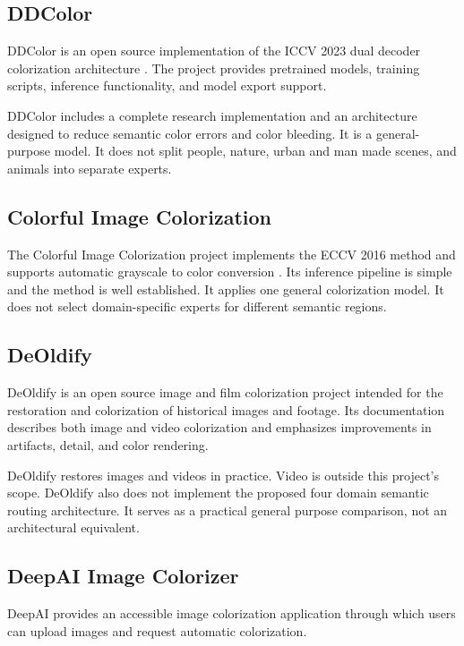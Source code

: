 \documentclass{FastFyp}
\begin{document}
\subsection{DDColor}

DDColor is an open source implementation of the ICCV 2023 dual decoder colorization architecture \cite{ref9,ref10}. The project provides pretrained models, training scripts, inference functionality, and model export support.

DDColor includes a complete research implementation and an architecture designed to reduce semantic color errors and color bleeding. It is a general-purpose model. It does not split people, nature, urban and man made scenes, and animals into separate experts.

\subsection{Colorful Image Colorization}

The Colorful Image Colorization project implements the ECCV 2016 method and supports automatic grayscale to color conversion \cite{ref1,ref22}. Its inference pipeline is simple and the method is well established. It applies one general colorization model. It does not select domain-specific experts for different semantic regions.

\subsection{DeOldify}

DeOldify \cite{deoldify} is an open source image and film colorization project intended for the restoration and colorization of historical images and footage. Its documentation describes both image and video colorization and emphasizes improvements in artifacts, detail, and color rendering.

DeOldify restores images and videos in practice. Video is outside this project's scope. DeOldify also does not implement the proposed four domain semantic routing architecture. It serves as a practical general purpose comparison, not an architectural equivalent.

\subsection{DeepAI Image Colorizer}

DeepAI \cite{deepai} provides an accessible image colorization application through which users can upload images and request automatic colorization.
\end{document}
